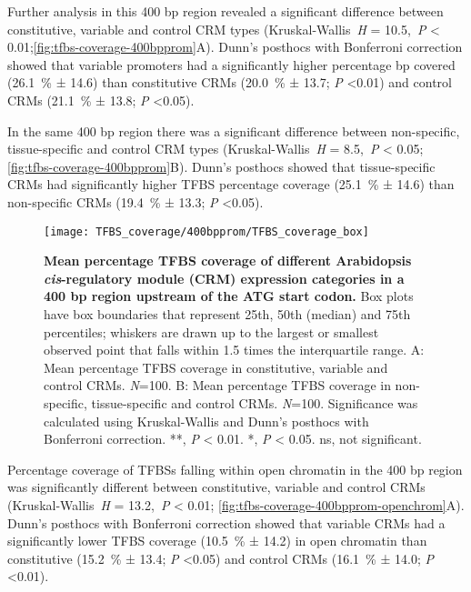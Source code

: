 \documentclass[../main.tex]{subfiles}
\begin{document}
{{Further analysis in this 400 bp region revealed a significant difference between constitutive, variable and control CRM types (Kruskal\hyp{}Wallis~\textit{H} = 10.5,~\textit{P} \textless{} 0.01;\autoref{fig:tfbs-coverage-400bpprom}A).
Dunn's posthocs with Bonferroni correction showed that variable promoters had a significantly higher percentage bp covered (\SI{26.1}{\percent} ± 14.6) than constitutive CRMs (\SI{20.0}{\percent} ± 13.7; \textit{P} \textless 0.01) and control CRMs (\SI{21.1}{\percent} ± 13.8; \textit{P} \textless 0.05).

In the same 400 bp region there was a significant difference between non\hyp{}specific, tissue\hyp{}specific and control CRM types (Kruskal\hyp{}Wallis~\textit{H} = 8.5,~\textit{P} \textless{} 0.05; \autoref{fig:tfbs-coverage-400bpprom}B).
Dunn's posthocs showed that tissue\hyp{}specific CRMs had significantly higher TFBS percentage coverage (\SI{25.1}{\percent} ± 14.6) than non\hyp{}specific CRMs (\SI{19.4}{\percent} ± 13.3; \textit{P} \textless 0.05).


\begin{figure}[hbt!]
	\begin{center}
		\capstart
		\texttt{[image: TFBS\_coverage/400bpprom/TFBS\_coverage\_box]}
		\caption{
			\textbf{Mean percentage TFBS coverage of different Arabidopsis \textit{cis}\hyp{}regulatory module (CRM) expression categories in a 400 bp region upstream of the ATG start codon.}
			Box plots have box boundaries that represent 25th, 50th (median) and 75th percentiles; whiskers are drawn up to the largest or smallest observed point that falls within 1.5 times the interquartile range.
			A: Mean percentage TFBS coverage in constitutive, variable and control CRMs. \textit{N}=100.
			B: Mean percentage TFBS coverage in non\hyp{}specific, tissue\hyp{}specific and control CRMs. \textit{N}=100.
			Significance was calculated using Kruskal\hyp{}Wallis and Dunn's posthocs with Bonferroni correction.
			**, \textit{P} \textless{} 0.01. *, \textit{P} \textless{} 0.05. ns, not significant.
			\label{fig:tfbs-coverage-400bpprom}
		}
	\end{center}
\end{figure}

Percentage coverage of TFBSs falling within open chromatin in the 400 bp region was significantly different between constitutive, variable and control CRMs (Kruskal\hyp{}Wallis~\textit{H} = 13.2,~\textit{P} \textless{} 0.01; \autoref{fig:tfbs-coverage-400bpprom-openchrom}A).
Dunn's posthocs with Bonferroni correction showed that variable CRMs had a significantly lower TFBS coverage (\SI{10.5}{\percent} ± 14.2) in open chromatin than constitutive (\SI{15.2}{\percent} ± 13.4; \textit{P} \textless 0.05) and control CRMs (\SI{16.1}{\percent} ± 14.0; \textit{P} \textless 0.01).

}}
\end{document}
